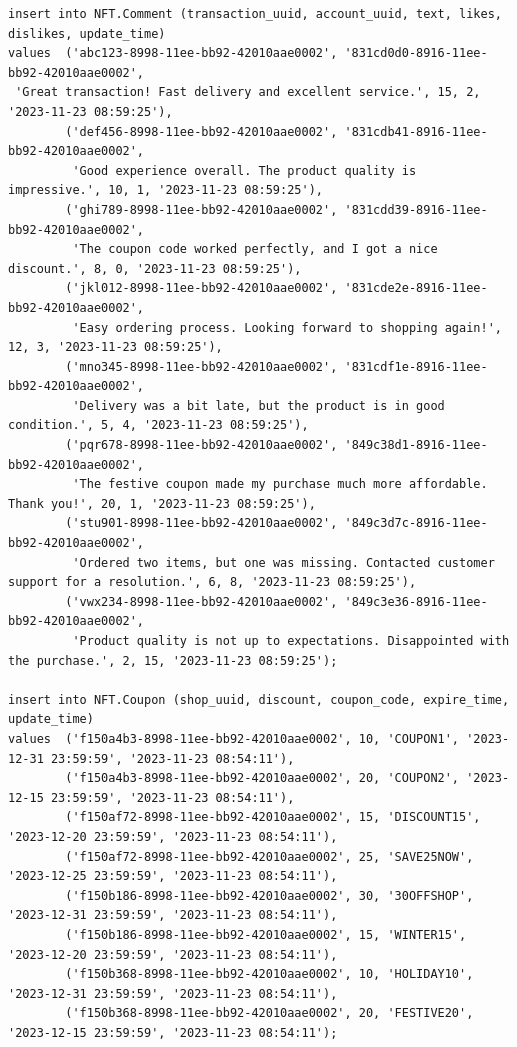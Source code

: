 \documentclass[a4paper, 12pt]{article}
\begin{document}
\begin{verbatim}
insert into NFT.Comment (transaction_uuid, account_uuid, text, likes, dislikes, update_time)
values  ('abc123-8998-11ee-bb92-42010aae0002', '831cd0d0-8916-11ee-bb92-42010aae0002',
 'Great transaction! Fast delivery and excellent service.', 15, 2, '2023-11-23 08:59:25'),
        ('def456-8998-11ee-bb92-42010aae0002', '831cdb41-8916-11ee-bb92-42010aae0002',
         'Good experience overall. The product quality is impressive.', 10, 1, '2023-11-23 08:59:25'),
        ('ghi789-8998-11ee-bb92-42010aae0002', '831cdd39-8916-11ee-bb92-42010aae0002',
         'The coupon code worked perfectly, and I got a nice discount.', 8, 0, '2023-11-23 08:59:25'),
        ('jkl012-8998-11ee-bb92-42010aae0002', '831cde2e-8916-11ee-bb92-42010aae0002',
         'Easy ordering process. Looking forward to shopping again!', 12, 3, '2023-11-23 08:59:25'),
        ('mno345-8998-11ee-bb92-42010aae0002', '831cdf1e-8916-11ee-bb92-42010aae0002',
         'Delivery was a bit late, but the product is in good condition.', 5, 4, '2023-11-23 08:59:25'),
        ('pqr678-8998-11ee-bb92-42010aae0002', '849c38d1-8916-11ee-bb92-42010aae0002',
         'The festive coupon made my purchase much more affordable. Thank you!', 20, 1, '2023-11-23 08:59:25'),
        ('stu901-8998-11ee-bb92-42010aae0002', '849c3d7c-8916-11ee-bb92-42010aae0002',
         'Ordered two items, but one was missing. Contacted customer support for a resolution.', 6, 8, '2023-11-23 08:59:25'),
        ('vwx234-8998-11ee-bb92-42010aae0002', '849c3e36-8916-11ee-bb92-42010aae0002',
         'Product quality is not up to expectations. Disappointed with the purchase.', 2, 15, '2023-11-23 08:59:25');
        
insert into NFT.Coupon (shop_uuid, discount, coupon_code, expire_time, update_time)
values  ('f150a4b3-8998-11ee-bb92-42010aae0002', 10, 'COUPON1', '2023-12-31 23:59:59', '2023-11-23 08:54:11'),
        ('f150a4b3-8998-11ee-bb92-42010aae0002', 20, 'COUPON2', '2023-12-15 23:59:59', '2023-11-23 08:54:11'),
        ('f150af72-8998-11ee-bb92-42010aae0002', 15, 'DISCOUNT15', '2023-12-20 23:59:59', '2023-11-23 08:54:11'),
        ('f150af72-8998-11ee-bb92-42010aae0002', 25, 'SAVE25NOW', '2023-12-25 23:59:59', '2023-11-23 08:54:11'),
        ('f150b186-8998-11ee-bb92-42010aae0002', 30, '30OFFSHOP', '2023-12-31 23:59:59', '2023-11-23 08:54:11'),
        ('f150b186-8998-11ee-bb92-42010aae0002', 15, 'WINTER15', '2023-12-20 23:59:59', '2023-11-23 08:54:11'),
        ('f150b368-8998-11ee-bb92-42010aae0002', 10, 'HOLIDAY10', '2023-12-31 23:59:59', '2023-11-23 08:54:11'),
        ('f150b368-8998-11ee-bb92-42010aae0002', 20, 'FESTIVE20', '2023-12-15 23:59:59', '2023-11-23 08:54:11');
        

\end{verbatim}
\end{document}
